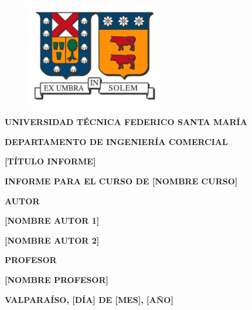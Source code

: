 \documentclass[letterpaper,11pt,oneside]{article}
\begin{document}
\renewcommand\contentsname{ÍNDICE}

\renewcommand{\listtablename}{ÍNDICE DE TABLAS}

\renewcommand{\listfigurename}{ÍNDICE DE ILUSTRACIONES}

\renewcommand\refname{REFERENCIAS}

\renewcommand{\tablename}{Tabla}

\renewcommand*{\tableautorefname}{Tabla}

\renewcommand{\figurename}{Figura}

\renewcommand*{\figureautorefname}{Figura}

\renewcommand*{\equationautorefname}{Ecuación}

\begin{titlepage}
    \centering
	\begin{figure}[htb]
	    \centering
		\includegraphics[width=6cm]{logo_usm1}
	\end{figure}
	{\textbf{UNIVERSIDAD TÉCNICA FEDERICO SANTA MARÍA} \par}
	{\textbf{DEPARTAMENTO DE INGENIERÍA COMERCIAL} \par}
    \vspace{1cm}
	{\textbf{[TÍTULO INFORME]} \par}
	\vspace{1cm}
	{\textbf{INFORME PARA EL CURSO DE [NOMBRE CURSO]} \par}
	\vspace{1cm}
	{\textbf{AUTOR} \par}
	{\textbf{[NOMBRE AUTOR 1]} \par}
	{\textbf{[NOMBRE AUTOR 2]} \par}
	\vspace{1cm}
	{\textbf{PROFESOR} \par} 
	{\textbf{[NOMBRE PROFESOR]} \par}
	\vfill
	{\textbf{VALPARAÍSO, [DÍA] DE [MES], [AÑO]} \par}
\end{titlepage}
\end{document}
